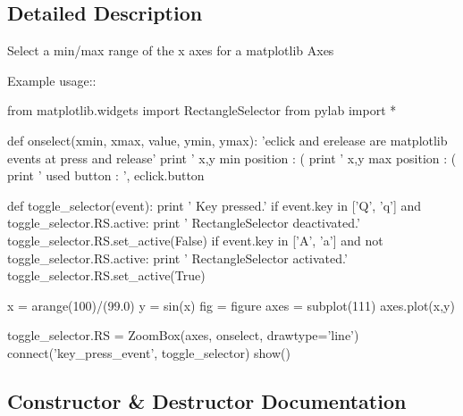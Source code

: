 \subsection{Detailed Description}
\begin{DoxyVerb}Select a min/max range of the x axes for a matplotlib Axes

Example usage::

    from matplotlib.widgets import  RectangleSelector
    from pylab import *

    def onselect(xmin, xmax, value, ymin, ymax):
      'eclick and erelease are matplotlib events at press and release'
      print ' x,y min position : (%
      print ' x,y max position   : (%
      print ' used button   : ', eclick.button

    def toggle_selector(event):
        print ' Key pressed.'
        if event.key in ['Q', 'q'] and toggle_selector.RS.active:
            print ' RectangleSelector deactivated.'
            toggle_selector.RS.set_active(False)
        if event.key in ['A', 'a'] and not toggle_selector.RS.active:
            print ' RectangleSelector activated.'
            toggle_selector.RS.set_active(True)

    x = arange(100)/(99.0)
    y = sin(x)
    fig = figure
    axes = subplot(111)
    axes.plot(x,y)

    toggle_selector.RS = ZoomBox(axes, onselect, drawtype='line')
    connect('key_press_event', toggle_selector)
    show()
\end{DoxyVerb}
 

\subsection{Constructor \& Destructor Documentation}
\hypertarget{class_uni_dec_1_1unidec__modules_1_1isolated__packages_1_1_zoom_box_1_1_zoom_box_a7537f4713e94995156ee0443ed328aa4}{}
